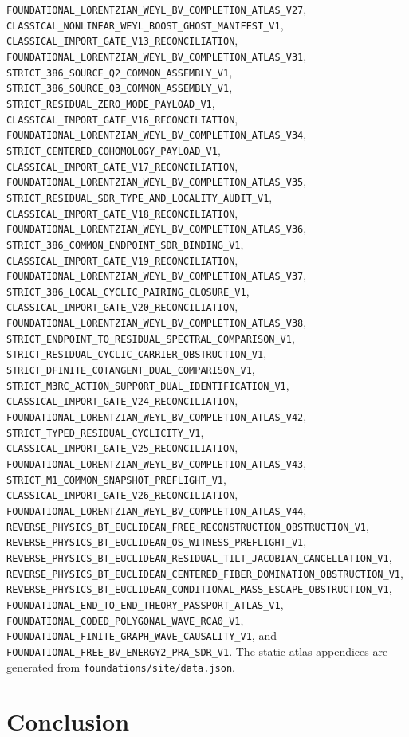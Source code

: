 \documentclass[11pt]{article}
\theoremstyle{definition}
\theoremstyle{remark}
\newcommand{\cert}[1]{\nolinkurl{#1}}
\begin{document}
\cert{FOUNDATIONAL_LORENTZIAN_WEYL_BV_COMPLETION_ATLAS_V27},
\cert{CLASSICAL_NONLINEAR_WEYL_BOOST_GHOST_MANIFEST_V1},
\cert{CLASSICAL_IMPORT_GATE_V13_RECONCILIATION},
\cert{FOUNDATIONAL_LORENTZIAN_WEYL_BV_COMPLETION_ATLAS_V31},
\cert{STRICT_386_SOURCE_Q2_COMMON_ASSEMBLY_V1},
\cert{STRICT_386_SOURCE_Q3_COMMON_ASSEMBLY_V1},
\cert{STRICT_RESIDUAL_ZERO_MODE_PAYLOAD_V1},
\cert{CLASSICAL_IMPORT_GATE_V16_RECONCILIATION},
\cert{FOUNDATIONAL_LORENTZIAN_WEYL_BV_COMPLETION_ATLAS_V34},
\cert{STRICT_CENTERED_COHOMOLOGY_PAYLOAD_V1},
\cert{CLASSICAL_IMPORT_GATE_V17_RECONCILIATION},
\cert{FOUNDATIONAL_LORENTZIAN_WEYL_BV_COMPLETION_ATLAS_V35},
\cert{STRICT_RESIDUAL_SDR_TYPE_AND_LOCALITY_AUDIT_V1},
\cert{CLASSICAL_IMPORT_GATE_V18_RECONCILIATION},
\cert{FOUNDATIONAL_LORENTZIAN_WEYL_BV_COMPLETION_ATLAS_V36},
\cert{STRICT_386_COMMON_ENDPOINT_SDR_BINDING_V1},
\cert{CLASSICAL_IMPORT_GATE_V19_RECONCILIATION},
\cert{FOUNDATIONAL_LORENTZIAN_WEYL_BV_COMPLETION_ATLAS_V37},
\cert{STRICT_386_LOCAL_CYCLIC_PAIRING_CLOSURE_V1},
\cert{CLASSICAL_IMPORT_GATE_V20_RECONCILIATION},
\cert{FOUNDATIONAL_LORENTZIAN_WEYL_BV_COMPLETION_ATLAS_V38},
\cert{STRICT_ENDPOINT_TO_RESIDUAL_SPECTRAL_COMPARISON_V1},
\cert{STRICT_RESIDUAL_CYCLIC_CARRIER_OBSTRUCTION_V1},
\cert{STRICT_DFINITE_COTANGENT_DUAL_COMPARISON_V1},
\cert{STRICT_M3RC_ACTION_SUPPORT_DUAL_IDENTIFICATION_V1},
\cert{CLASSICAL_IMPORT_GATE_V24_RECONCILIATION},
\cert{FOUNDATIONAL_LORENTZIAN_WEYL_BV_COMPLETION_ATLAS_V42},
\cert{STRICT_TYPED_RESIDUAL_CYCLICITY_V1},
\cert{CLASSICAL_IMPORT_GATE_V25_RECONCILIATION},
\cert{FOUNDATIONAL_LORENTZIAN_WEYL_BV_COMPLETION_ATLAS_V43},
\cert{STRICT_M1_COMMON_SNAPSHOT_PREFLIGHT_V1},
\cert{CLASSICAL_IMPORT_GATE_V26_RECONCILIATION},
\cert{FOUNDATIONAL_LORENTZIAN_WEYL_BV_COMPLETION_ATLAS_V44},
\cert{REVERSE_PHYSICS_BT_EUCLIDEAN_FREE_RECONSTRUCTION_OBSTRUCTION_V1},
\cert{REVERSE_PHYSICS_BT_EUCLIDEAN_OS_WITNESS_PREFLIGHT_V1},
\cert{REVERSE_PHYSICS_BT_EUCLIDEAN_RESIDUAL_TILT_JACOBIAN_CANCELLATION_V1},
\cert{REVERSE_PHYSICS_BT_EUCLIDEAN_CENTERED_FIBER_DOMINATION_OBSTRUCTION_V1},
\cert{REVERSE_PHYSICS_BT_EUCLIDEAN_CONDITIONAL_MASS_ESCAPE_OBSTRUCTION_V1},
\cert{FOUNDATIONAL_END_TO_END_THEORY_PASSPORT_ATLAS_V1},
\cert{FOUNDATIONAL_CODED_POLYGONAL_WAVE_RCA0_V1},
\cert{FOUNDATIONAL_FINITE_GRAPH_WAVE_CAUSALITY_V1}, and
\cert{FOUNDATIONAL_FREE_BV_ENERGY2_PRA_SDR_V1}.  The static atlas appendices
are generated from \cert{foundations/site/data.json}.

\section{Conclusion}
\label{sec:conclusion}
\end{document}
